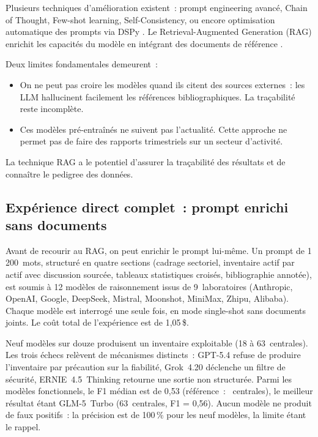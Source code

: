 \documentclass[a4paper,11pt]{report}
\begin{document}
Plusieurs techniques d'amélioration existent~: prompt engineering avancé, Chain of Thought, Few-shot learning, Self-Consistency, ou encore optimisation automatique des prompts via DSPy \citep{ATRGAC9J}. Le Retrieval-Augmented Generation (RAG) \citep{2U9Y8AJK} enrichit les capacités du modèle en intégrant des documents de référence \citep{JNKUDLN8,Y95UBRJ9}.

Deux limites fondamentales demeurent~:

\begin{itemize}
\item On ne peut pas croire les modèles quand ils citent des sources externes~: les LLM hallucinent facilement les références bibliographiques. La traçabilité reste incomplète.
\item Ces modèles pré-entraînés ne suivent pas l'actualité. Cette approche ne permet pas de faire des rapports trimestriels sur un secteur d'activité.
\end{itemize}

La technique RAG a le potentiel d'assurer la traçabilité des résultats et de connaître le pedigree des données.

\subsection{Expérience direct complet~: prompt enrichi sans documents}\label{sec:direct_complete}

Avant de recourir au RAG, on peut enrichir le prompt lui-même. Un prompt de 1\,200~mots, structuré en quatre sections (cadrage sectoriel, inventaire actif par actif avec discussion sourcée, tableaux statistiques croisés, bibliographie annotée), est soumis à 12 modèles de raisonnement issus de 9~laboratoires (Anthropic, OpenAI, Google, DeepSeek, Mistral, Moonshot, MiniMax, Zhipu, Alibaba). Chaque modèle est interrogé une seule fois, en mode single-shot sans documents joints. Le coût total de l'expérience est de 1,05\,\$.

Neuf modèles sur douze produisent un inventaire exploitable (18 à 63~centrales). Les trois échecs relèvent de mécanismes distincts~: GPT-5.4 refuse de produire l'inventaire par précaution sur la fiabilité, Grok~4.20 déclenche un filtre de sécurité, ERNIE~4.5~Thinking retourne une sortie non structurée. Parmi les modèles fonctionnels, le F1 médian est de 0,53 (référence~: \NumRefPlants{}~centrales), le meilleur résultat étant GLM-5~Turbo (63~centrales, F1 = 0,56). Aucun modèle ne produit de faux positifs~: la précision est de 100\,\% pour les neuf modèles, la limite étant le rappel.
\end{document}
